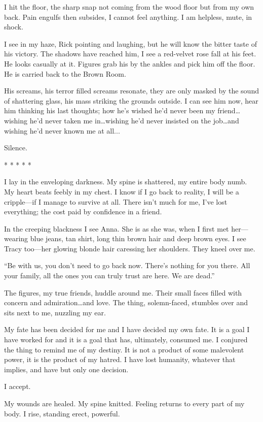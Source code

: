I hit the floor, the sharp snap not coming from the wood floor but from
my own back. Pain engulfs then subsides, I cannot feel anything. I am
helpless, mute, in shock.

I see in my haze, Rick pointing and laughing, but he will know the
bitter taste of his victory. The shadows have reached him, I see a
red-velvet rose fall at his feet. He looks casually at it. Figures grab
his by the ankles and pick him off the floor. He is carried back to the
Brown Room.

His screams, his terror filled screams resonate, they are only masked by
the sound of shattering glass, his mass striking the grounds outside. I
can see him now, hear him thinking his last thoughts; how he's wished
he'd never been my friend\ldots wishing he'd never taken me
in\ldots wishing he'd never insisted on the job\ldots and wishing he'd
never known me at all...

Silence.

* * * * *

I lay in the enveloping darkness. My spine is shattered, my entire body
numb. My heart beats feebly in my chest. I know if I go back to reality,
I will be a cripple---if I manage to survive at all. There isn't much
for me, I've lost everything; the cost paid by confidence in a friend.

In the creeping blackness I see Anna. She is as she was, when I first
met her---wearing blue jeans, tan shirt, long thin brown hair and deep
brown eyes. I see Tracy too---her glowing blonde hair caressing her
shoulders. They kneel over me.

``Be with us, you don't need to go back now. There's nothing for you
there. All your family, all the ones you can truly trust are here. We
are dead.''

The figures, my true friends, huddle around me. Their small faces filled
with concern and admiration\ldots and love. The thing, solemn-faced,
stumbles over and sits next to me, nuzzling my ear.

My fate has been decided for me and I have decided my own fate. It is a
goal I have worked for and it is a goal that has, ultimately, consumed
me. I conjured the thing to remind me of my destiny. It is not a product
of some malevolent power, it is the product of my hatred. I have lost
humanity, whatever that implies, and have but only one decision.

I accept.

My wounds are healed. My spine knitted. Feeling returns to every part of
my body. I rise, standing erect, powerful.

